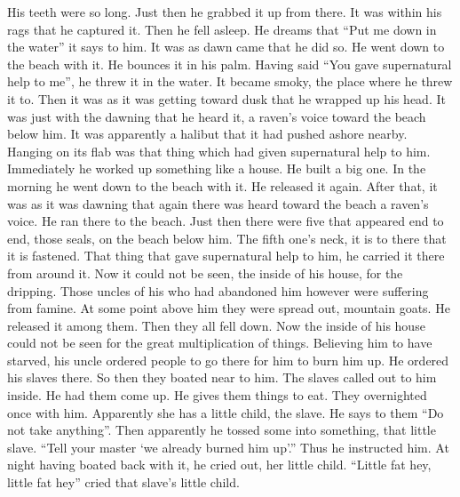 \begin{pairs}
\begin{Rightside}
His teeth were so long.
Just then he grabbed it up from there.
It was within his rags that he captured it.
Then he fell asleep.
He dreams that “Put me down in the water” it says to him.
It was as dawn came that he did so.
He went down to the beach with it.
He bounces it in his palm.
Having said “You gave supernatural help to me”, he threw it in the water.
It became smoky, the place where he threw it to.
Then it was as it was getting toward dusk that he wrapped up his head.
It was just with the dawning that he heard it, a raven’s voice toward the beach below him.
It was apparently a halibut that it had pushed ashore nearby.
Hanging on its flab was that thing which had given supernatural help to him.
\pend
\pstart
{}Immediately he worked up something like a house.
He built a big one.
In the morning he went down to the beach with it.
He released it again.
After that, it was as it was dawning that again there was heard toward the beach a raven’s voice.
He ran there to the beach.
Just then there were five that appeared end to end, those seals, on the beach below him.
The fifth one’s neck, it is to there that it is fastened.
That thing that gave supernatural help to him, he carried it there from around it.
Now it could not be seen, the inside of his house, for the dripping.
Those uncles of his who had abandoned him however were suffering from famine.
\pend
\pstart
{}At some point above him they were spread out, mountain goats.
He released it among them.
Then they all fell down.
Now the inside of his house could not be seen for the great multiplication of things.
\pend
\pstart
{}Believing him to have starved, his uncle ordered people to go there for him to burn him up.
He ordered his slaves there.
So then they boated near to him.
The slaves called out to him inside.
He had them come up.
He gives them things to eat.
They overnighted once with him.
Apparently she has a little child, the slave.
He says to them
\qqk{}“Do not take anything”.
Then apparently he tossed some into something, that little slave.
\qqk{}“Tell your master ‘we already burned him up’.”
Thus he instructed him.
\pend
\pstart
{}At night having boated back with it, he cried out, her little child.
\qqk{}“Little fat hey, little fat hey” cried that slave’s little child.

\end{Rightside}
\end{pairs}
